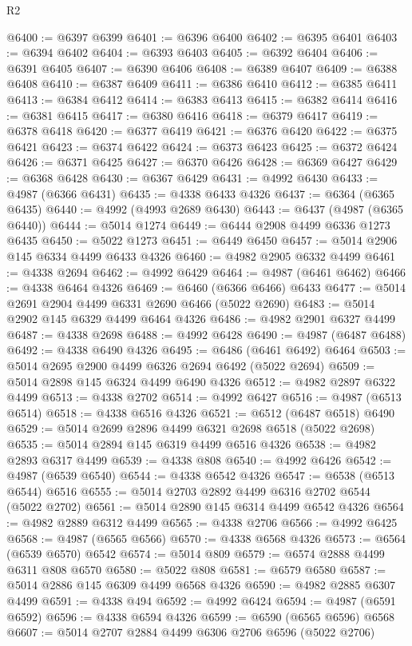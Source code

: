 \begin{lexlean}{R2}
\begin{coremodule}
@6400 := @6397 @6399
@6401 := @6396 @6400
@6402 := @6395 @6401
@6403 := @6394 @6402
@6404 := @6393 @6403
@6405 := @6392 @6404
@6406 := @6391 @6405
@6407 := @6390 @6406
@6408 := @6389 @6407
@6409 := @6388 @6408
@6410 := @6387 @6409
@6411 := @6386 @6410
@6412 := @6385 @6411
@6413 := @6384 @6412
@6414 := @6383 @6413
@6415 := @6382 @6414
@6416 := @6381 @6415
@6417 := @6380 @6416
@6418 := @6379 @6417
@6419 := @6378 @6418
@6420 := @6377 @6419
@6421 := @6376 @6420
@6422 := @6375 @6421
@6423 := @6374 @6422
@6424 := @6373 @6423
@6425 := @6372 @6424
@6426 := @6371 @6425
@6427 := @6370 @6426
@6428 := @6369 @6427
@6429 := @6368 @6428
@6430 := @6367 @6429
@6431 := @4992 @6430
@6433 := @4987 (@6366 @6431)
@6435 := @4338 @6433 @4326
@6437 := @6364 (@6365 @6435)
@6440 := @4992 (@4993 @2689 @6430)
@6443 := @6437 (@4987 (@6365 @6440))
@6444 := @5014 @1274
@6449 := @6444 @2908 @4499 @6336 @1273 @6435
@6450 := @5022 @1273
@6451 := @6449 @6450
@6457 := @5014 @2906 @145 @6334 @4499 @6433 @4326
@6460 := @4982 @2905 @6332 @4499
@6461 := @4338 @2694
@6462 := @4992 @6429
@6464 := @4987 (@6461 @6462)
@6466 := @4338 @6464 @4326
@6469 := @6460 (@6366 @6466) @6433
@6477 := @5014 @2691 @2904 @4499 @6331 @2690 @6466 (@5022 @2690)
@6483 := @5014 @2902 @145 @6329 @4499 @6464 @4326
@6486 := @4982 @2901 @6327 @4499
@6487 := @4338 @2698
@6488 := @4992 @6428
@6490 := @4987 (@6487 @6488)
@6492 := @4338 @6490 @4326
@6495 := @6486 (@6461 @6492) @6464
@6503 := @5014 @2695 @2900 @4499 @6326 @2694 @6492 (@5022 @2694)
@6509 := @5014 @2898 @145 @6324 @4499 @6490 @4326
@6512 := @4982 @2897 @6322 @4499
@6513 := @4338 @2702
@6514 := @4992 @6427
@6516 := @4987 (@6513 @6514)
@6518 := @4338 @6516 @4326
@6521 := @6512 (@6487 @6518) @6490
@6529 := @5014 @2699 @2896 @4499 @6321 @2698 @6518 (@5022 @2698)
@6535 := @5014 @2894 @145 @6319 @4499 @6516 @4326
@6538 := @4982 @2893 @6317 @4499
@6539 := @4338 @808
@6540 := @4992 @6426
@6542 := @4987 (@6539 @6540)
@6544 := @4338 @6542 @4326
@6547 := @6538 (@6513 @6544) @6516
@6555 := @5014 @2703 @2892 @4499 @6316 @2702 @6544 (@5022 @2702)
@6561 := @5014 @2890 @145 @6314 @4499 @6542 @4326
@6564 := @4982 @2889 @6312 @4499
@6565 := @4338 @2706
@6566 := @4992 @6425
@6568 := @4987 (@6565 @6566)
@6570 := @4338 @6568 @4326
@6573 := @6564 (@6539 @6570) @6542
@6574 := @5014 @809
@6579 := @6574 @2888 @4499 @6311 @808 @6570
@6580 := @5022 @808
@6581 := @6579 @6580
@6587 := @5014 @2886 @145 @6309 @4499 @6568 @4326
@6590 := @4982 @2885 @6307 @4499
@6591 := @4338 @494
@6592 := @4992 @6424
@6594 := @4987 (@6591 @6592)
@6596 := @4338 @6594 @4326
@6599 := @6590 (@6565 @6596) @6568
@6607 := @5014 @2707 @2884 @4499 @6306 @2706 @6596 (@5022 @2706)

\end{coremodule}
\end{lexlean}
